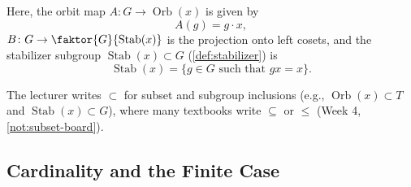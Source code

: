 \begin{content}
Here, the orbit map $A \colon G \to \operatorname{Orb}(x)$ is given by
\[
A(g) = g \cdot x,
\]
$B \colon G \to \faktor{G}{\operatorname{Stab}(x)}$ is the projection onto left cosets, and the stabilizer subgroup $\operatorname{Stab}(x) \subset G$ (\cref{def:stabilizer}) is
\[
\operatorname{Stab}(x) = \{ g \in G \text{ such that } g x = x \}.
\]

\end{content}

\begin{aiNote}
The lecturer writes $\subset$ for subset and subgroup inclusions (e.g., $\operatorname{Orb}(x) \subset T$ and $\operatorname{Stab}(x) \subset G$), where many textbooks write $\subseteq$ or $\le$ (Week 4, \cref{not:subset-board}).
\end{aiNote}

\subsection{Cardinality and the Finite Case}

